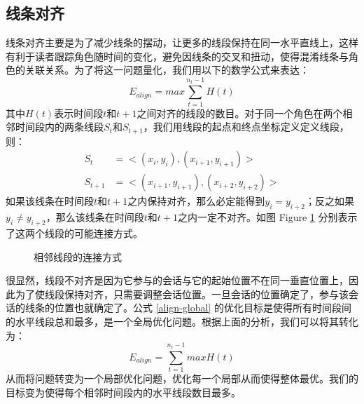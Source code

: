 \subsection{线条对齐}
线条对齐主要是为了减少线条的摆动，让更多的线段保持在同一水平直线上，这样有利于读者跟踪角色随时间的变化，避免因线条的交叉和扭动，使得混淆线条与角色的关联关系。为了将这一问题量化，我们用以下的数学公式来表达：
\begin{equation}
\label{align-global}
E_{align} = max \sum_{t=1}^{n_t-1} H\left(t\right)
\end{equation}
其中$H\left(t\right)$表示时间段$t$和$t+1$之间对齐的线段的数目。对于同一个角色在两个相邻时间段内的两条线段$S_t$和$S_{t+1}$，我们用线段的起点和终点坐标定义定义线段，则：
\begin{subequations}
\begin{align}
	S_t & = <(x_i, y_i), (x_{i+1},y_{i+1})> \label{eq:segment-1}\\
	S_{t+1} & = <(x_{i+1}, y_{i+1}), (x_{i+2},y_{i+2})> \label{eq:segment-2}
\end{align}
\end{subequations}
如果该线条在时间段$t$和$t+1$之内保持对齐，那么必定能得到$y_i = y_{i+2}$；反之如果$y_i \neq y_{i+2}$，那么该线条在时间段$t$和$t+1$之内一定不对齐。如图 Figure \ref{fig:line-segment-layout} 分别表示了这两个线段的可能连接方式。
\begin{figure}[h]
  \caption{相邻线段的连接方式}
  \label{fig:line-segment-layout}
\end{figure}

很显然，线段不对齐是因为它参与的会话与它的起始位置不在同一垂直位置上，因此为了使线段保持对齐，只需要调整会话位置。一旦会话的位置确定了，参与该会话的线条的位置也就确定了。公式 \ref{align-global} 的优化目标是使得所有时间段间的水平线段总和最多，是一个全局优化问题。根据上面的分析，我们可以将其转化为：
\begin{equation}
\label{align-local}
E_{align} = \sum_{t=1}^{n_t-1} max H\left(t\right)
\end{equation}
从而将问题转变为一个局部优化问题，优化每一个局部从而使得整体最优。我们的目标变为使得每个相邻时间段内的水平线段数目最多。

